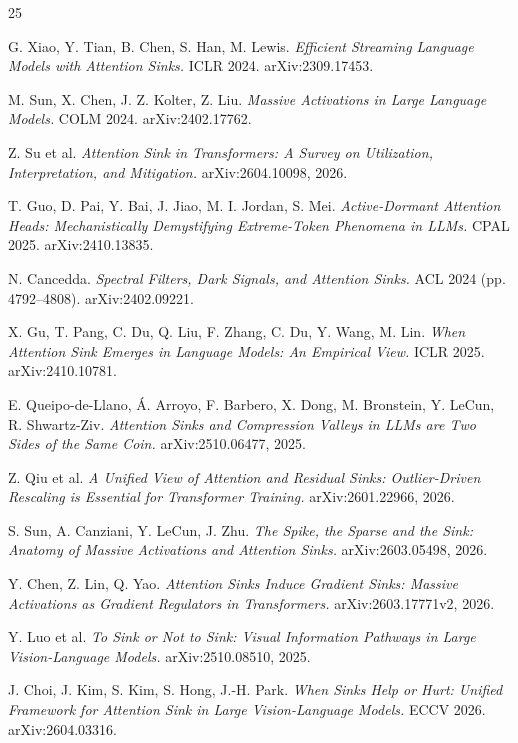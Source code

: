 \documentclass{article}
\begin{document}
\clearpage
\small
\begin{thebibliography}{25}

G. Xiao, Y. Tian, B. Chen, S. Han, M. Lewis. \textit{Efficient Streaming Language Models with Attention Sinks.} ICLR 2024. arXiv:2309.17453.

M. Sun, X. Chen, J. Z. Kolter, Z. Liu. \textit{Massive Activations in Large Language Models.} COLM 2024. arXiv:2402.17762.

Z. Su et al. \textit{Attention Sink in Transformers: A Survey on Utilization, Interpretation, and Mitigation.} arXiv:2604.10098, 2026.

T. Guo, D. Pai, Y. Bai, J. Jiao, M. I. Jordan, S. Mei. \textit{Active-Dormant Attention Heads: Mechanistically Demystifying Extreme-Token Phenomena in LLMs.} CPAL 2025. arXiv:2410.13835.

N. Cancedda. \textit{Spectral Filters, Dark Signals, and Attention Sinks.} ACL 2024 (pp. 4792--4808). arXiv:2402.09221.

X. Gu, T. Pang, C. Du, Q. Liu, F. Zhang, C. Du, Y. Wang, M. Lin. \textit{When Attention Sink Emerges in Language Models: An Empirical View.} ICLR 2025. arXiv:2410.10781.

E. Queipo-de-Llano, Á. Arroyo, F. Barbero, X. Dong, M. Bronstein, Y. LeCun, R. Shwartz-Ziv. \textit{Attention Sinks and Compression Valleys in LLMs are Two Sides of the Same Coin.} arXiv:2510.06477, 2025.

Z. Qiu et al. \textit{A Unified View of Attention and Residual Sinks: Outlier-Driven Rescaling is Essential for Transformer Training.} arXiv:2601.22966, 2026.

S. Sun, A. Canziani, Y. LeCun, J. Zhu. \textit{The Spike, the Sparse and the Sink: Anatomy of Massive Activations and Attention Sinks.} arXiv:2603.05498, 2026.

Y. Chen, Z. Lin, Q. Yao. \textit{Attention Sinks Induce Gradient Sinks: Massive Activations as Gradient Regulators in Transformers.} arXiv:2603.17771v2, 2026.

Y. Luo et al. \textit{To Sink or Not to Sink: Visual Information Pathways in Large Vision-Language Models.} arXiv:2510.08510, 2025.

J. Choi, J. Kim, S. Kim, S. Hong, J.-H. Park. \textit{When Sinks Help or Hurt: Unified Framework for Attention Sink in Large Vision-Language Models.} ECCV 2026. arXiv:2604.03316.


\end{thebibliography}
\end{document}

